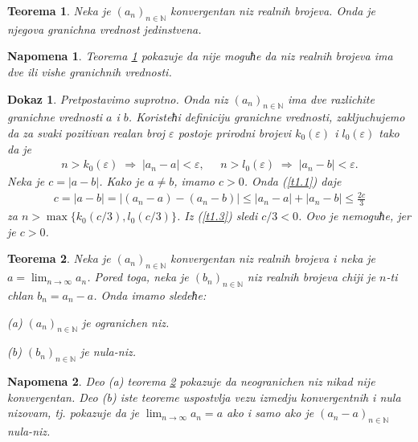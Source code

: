 \documentclass[11pt,a4paper]{article}
\newtheorem{thm}{Teorema}[section]
\newtheorem*{nap}{Napomena}
\newtheorem*{dokaz}{Dokaz}
\begin{document}
\begin{thm}\label{thm1}
Neka je $(a_n)_{n\in\mathbb{N}}$ konvergentan niz realnih brojeva. 
Onda je njegova granichna vrednost jedinstvena. 
\end{thm}

\begin{nap}
Teorema \ref{thm1} pokazuje da nije moguћe da niz realnih brojeva 
ima dve ili vishe granichnih vrednosti. 
\end{nap}

\begin{dokaz}
Pretpostavimo suprotno. 
Onda niz $(a_n)_{n\in\mathbb{N}}$ ima dve razlichite granichne 
vrednosti $a$ i $b$. 
Koristeћi definiciju granichne vrednosti, 
zakljuchujemo da za svaki pozitivan realan broj $\varepsilon$ 
postoje prirodni brojevi $k_{0}(\varepsilon)$ i $l_{0}(\varepsilon)$ 
tako da je 
\begin{align}\label{t1.1}
    n>k_{0}(\varepsilon) \;\Rightarrow\; |a_{n}-a|<\varepsilon, 
    \;\;\;\;\; 
    n>l_{0}(\varepsilon) \;\Rightarrow\; |a_n-b|<\varepsilon. 
\end{align}
Neka je $c=|a-b|$. Kako je $a\neq b$, imamo $c>0$. 
Onda (\ref{t1.1}) daje 
\begin{align}\label{t1.3}
    c=|a-b|=|(a_n-a)-(a_n-b)|
    \leq 
    |a_n-a|+|a_n-b|
    \leq 
    \frac{2c}{3}
\end{align}
za $n>\max\{k_{0}(c/3),l_{0}(c/3)\}$.
Iz (\ref{t1.3}) sledi $c/3<0$. 
Ovo je nemoguћe, jer je $c>0$. 
\end{dokaz}

\begin{thm}\label{thm2}
Neka je $(a_n)_{n\in\mathbb{N}}$ konvergentan niz realnih brojeva
i neka je $a=\displaystyle\lim_{n\rightarrow\infty}a_n$.
Pored toga, neka je $(b_n)_{n\in\mathbb{N}}$ niz realnih brojeva 
chiji je $n$-ti chlan $b_{n}=a_n-a$. 
Onda imamo sledeћe: 

(a) $(a_n)_{n\in\mathbb{N}}$ je ogranichen niz. 

(b) $(b_n)_{n\in\mathbb{N}}$ je nula-niz. 
\end{thm}

\begin{nap}
Deo (a) teorema \ref{thm2} pokazuje da neogranichen niz 
nikad nije konvergentan. 
Deo (b) iste teoreme uspostvlja vezu izmedju konvergentnih i 
nula nizovam, tj. pokazuje 
da je $\displaystyle\lim_{n\rightarrow\infty}a_n=a$ 
ako i samo ako je $(a_n-a)_{n\in\mathbb{N}}$ nula-niz. 
\end{nap}
\end{document}
